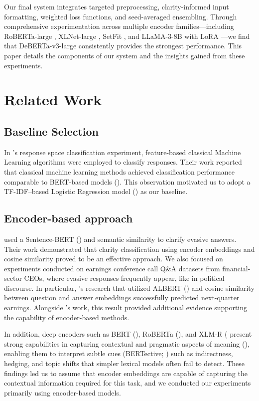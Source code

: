 \documentclass[11pt]{article}
\begin{document}
Our final system integrates targeted preprocessing, clarity-informed input formatting, weighted loss functions, and seed-averaged ensembling. Through comprehensive experimentation across multiple encoder families—including RoBERTa-large \citep{liu2020roberta}, XLNet-large \citep{yang2019xlnet}, SetFit \citep{pannerselvam-etal-2024-setfit}, and LLaMA-3-8B \citep{2024arXiv240721783G} with LoRA \citep{hu2022lora}—we find that DeBERTa-v3-large \citep{DeBERTaV3} consistently provides the strongest performance. This paper details the components of our system and the insights gained from these experiments.

\section{Related Work}
\subsection{Baseline Selection}
In \citet{Yusupujiang}'s response space classification experiment, feature-based classical Machine Learning algorithms were employed to classify responses. Their work reported that classical machine learning methods achieved classification performance comparable to BERT-based models (\citealp{devlin2019bert}). This observation motivated us to adopt a TF-IDF–based Logistic Regression model (\citet{sparck1972statistical, cox1958regression}) as our baseline.
\subsection{Encoder-based approach}
\citet{Alvarez_Morrier_2025} used a Sentence-BERT (\citealp{reimers2019sentencebert}) and semantic similarity to clarify evasive answers. Their work demonstrated that clarity classification using encoder embeddings and cosine similarity proved to be an effective approach. We also focused on experiments conducted on earnings conference call Q\&A datasets from financial-sector CEOs, where evasive responses frequently appear, like in political discourse. In particular, \citet{nuaimi-etal-2025-detecting}'s research that utilized ALBERT (\citealp{lan2019albert}) and cosine similarity between question and answer embeddings successfully predicted next-quarter earnings. Alongside \citet{Alvarez_Morrier_2025}'s work, this result provided additional evidence supporting the capability of encoder-based methods.


In addition, deep encoders such as BERT (\citealp{devlin2019bert}), RoBERTa (\citealp{liu2020roberta}), and XLM-R (\citealp{conneau2019xlmr} present strong capabilities in capturing contextual and pragmatic aspects of meaning (\citealp{wang2023interpretingindirectanswersyesno}), enabling them to interpret subtle cues (BERTective; \citealp{fornaciari-etal-2021-bertective}) such as indirectness, hedging, and topic shifts that simpler lexical models often fail to detect. These findings led us to assume that encoder embeddings are capable of capturing the contextual information required for this task, and we conducted our experiments primarily using encoder-based models.
\end{document}
